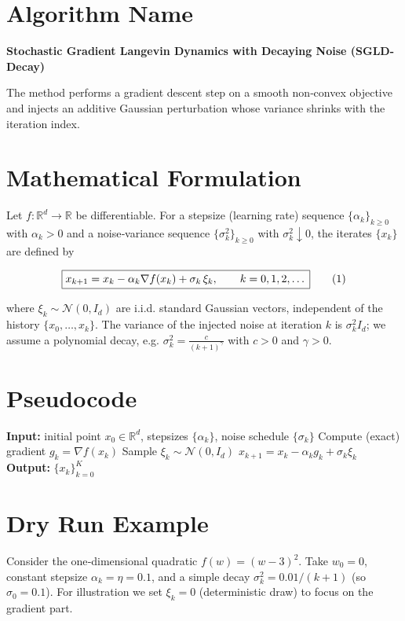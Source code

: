\documentclass{article}
\newcommand{\R}{\mathbb{R}}
\begin{document}
\section*{Algorithm Name}
\textbf{Stochastic Gradient Langevin Dynamics with Decaying Noise (SGLD-Decay)}  

The method performs a gradient descent step on a smooth non‑convex objective and injects an additive Gaussian perturbation whose variance shrinks with the iteration index.

\section*{Mathematical Formulation}
Let $f:\R^{d}\rightarrow\R$ be differentiable.  
For a stepsize (learning rate) sequence $\{\alpha_k\}_{k\ge0}$ with $\alpha_k>0$ and a noise‑variance sequence $\{\sigma_k^2\}_{k\ge0}$ with $\sigma_k^2\downarrow0$, the iterates $\{x_k\}$ are defined by  

\[
\boxed{%
x_{k+1}=x_k-\alpha_k \nabla f(x_k)+\sigma_k \,\xi_k ,\qquad k=0,1,2,\dots
}
\tag{1}
\]

where $\xi_k\sim\mathcal N(0,I_d)$ are i.i.d. standard Gaussian vectors, independent of the history $\{x_0,\dots,x_k\}$.  
The variance of the injected noise at iteration $k$ is $\sigma_k^2 I_d$; we assume a polynomial decay, e.g. $\sigma_k^2 =\frac{c}{(k+1)^{\gamma}}$ with $c>0$ and $\gamma>0$.

\section*{Pseudocode}
\begin{algorithm}[H]
\caption{SGLD‑Decay}
\begin{algorithmic}[1]
\STATE \textbf{Input:} initial point $x_0\in\R^d$, stepsizes $\{\alpha_k\}$, noise schedule $\{\sigma_k\}$
    \STATE Compute (exact) gradient $g_k=\nabla f(x_k)$
    \STATE Sample $\xi_k\sim\mathcal N(0,I_d)$
    \STATE $x_{k+1}=x_k-\alpha_k g_k+\sigma_k\xi_k$
\ENDFOR
\STATE \textbf{Output:} $\{x_k\}_{k=0}^{K}$
\end{algorithmic}
\end{algorithm}

\section*{Dry Run Example}
Consider the one‑dimensional quadratic $f(w)=(w-3)^2$.  
Take $w_0=0$, constant stepsize $\alpha_k=\eta=0.1$, and a simple decay $\sigma_k^2=0.01/(k+1)$ (so $\sigma_0=0.1$).  
For illustration we set $\xi_k=0$ (deterministic draw) to focus on the gradient part.
\end{document}
